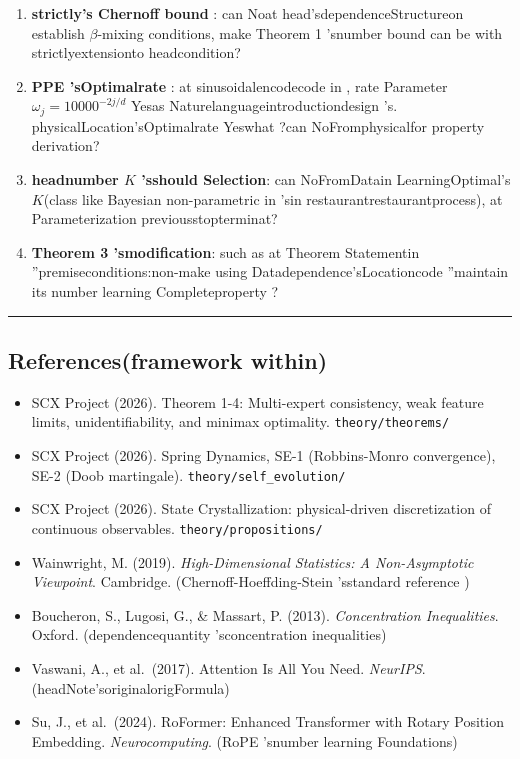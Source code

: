\documentclass[
  12pt,
]{article}
\providecommand{\tightlist}{%
  \setlength{\itemsep}{0pt}\setlength{\parskip}{0pt}}
\begin{document}
\begin{enumerate}
\def\labelenumi{\arabic{enumi}.}
\item
  \textbf{strictly's Chernoff bound }: can Noat head'sdependenceStructureon establish 
  \(\beta\)-mixing conditions, make  Theorem 1 'snumber bound can be with strictlyextensionto headcondition?
\item
  \textbf{PPE 'sOptimalrate }: at  sinusoidalencodecode in , rate Parameter
  \(\omega_j = 10000^{-2j/d}\)
  Yesas Naturelanguageintroductiondesign 's. physicalLocation'sOptimalrate Yeswhat ?can NoFromphysicalfor property derivation?
\item
  \textbf{headnumber  \(K\) 'sshould Selection}: can NoFromDatain LearningOptimal's \(K\)(class like
  Bayesian non-parametric in 'sin restaurantrestaurantprocess), at Parameterization previousstopterminat?
\item
  \textbf{Theorem 3
  'smodification}: such as at Theorem Statementin  ''premiseconditions:non-make using Datadependence'sLocationcode ''maintain its number learning Completeproperty ?
\end{enumerate}

\begin{center}\rule{0.5\linewidth}{0.5pt}\end{center}

\subsection{References(framework within)}\label{ux53c2ux8003ux6587ux732eux6846ux67b6ux5185ux90e8}

\begin{itemize}
\tightlist
\item
  SCX Project (2026). Theorem 1-4: Multi-expert consistency, weak
  feature limits, unidentifiability, and minimax optimality.
  \texttt{theory/theorems/}
\item
  SCX Project (2026). Spring Dynamics, SE-1 (Robbins-Monro convergence),
  SE-2 (Doob martingale). \texttt{theory/self\_evolution/}
\item
  SCX Project (2026). State Crystallization: physical-driven
  discretization of continuous observables.
  \texttt{theory/propositions/}
\item
  Wainwright, M. (2019). \emph{High-Dimensional Statistics: A
  Non-Asymptotic Viewpoint}. Cambridge. (Chernoff-Hoeffding-Stein
  'sstandard reference )
\item
  Boucheron, S., Lugosi, G., \& Massart, P. (2013). \emph{Concentration
  Inequalities}. Oxford. (dependencequantity 'sconcentration inequalities)
\item
  Vaswani, A., et al.~(2017). Attention Is All You Need. \emph{NeurIPS}.
  (headNote'soriginalorigFormula)
\item
  Su, J., et al.~(2024). RoFormer: Enhanced Transformer with Rotary
  Position Embedding. \emph{Neurocomputing}. (RoPE 'snumber learning Foundations)
\end{itemize}
\end{document}
